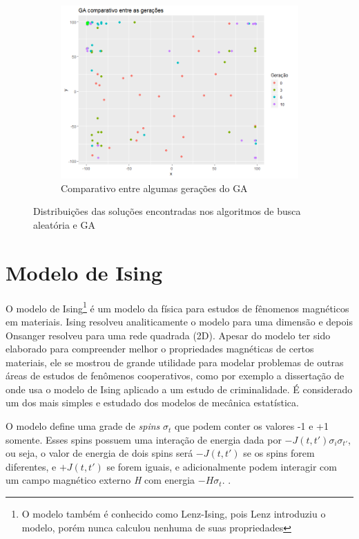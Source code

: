 \begin{figure}[ht]
\begin{subfigure}[b]{0.65\linewidth}
		\includegraphics[width=\linewidth]{imagens/scatter_GA_P30_T10b.png}
		\caption{Comparativo entre algumas gerações do GA}
	\end{subfigure}
	\caption{Distribuições das soluções encontradas nos algoritmos de busca aleatória e GA}
	\label{fig:scatter_RS_GA}
\end{figure}



\section{Modelo de Ising}

O modelo de Ising\footnote{O modelo também é conhecido como Lenz-Ising, pois Lenz introduziu o modelo, porém nunca calculou nenhuma de suas propriedades} é um modelo da física para estudos de fênomenos magnéticos em materiais. Ising resolveu analiticamente o modelo para uma dimensão e depois Onsanger resolveu para uma rede quadrada (2D). Apesar do modelo ter sido elaborado para compreender melhor o propriedades magnéticas de certos materiais, ele se mostrou de grande utilidade para modelar problemas de outras áreas de estudos de fenômenos cooperativos, como por exemplo a dissertação de  onde usa o modelo de Ising aplicado a um estudo de criminalidade. É considerado um dos mais simples e estudado dos modelos de mecânica estatística.

O modelo define uma grade de \textit{spins} \(\sigma_t\) que podem conter os valores -1 e +1 somente. Esses spins possuem uma interação de energia dada por \(-J(t, t')\sigma_i\sigma_{t'}\), ou seja, o valor de energia de dois spins será \(-J(t, t')\) se os spins forem diferentes, e \(+J(t, t')\) se forem iguais, e adicionalmente podem interagir com um campo magnético externo \textit{H} com energia \(-H\sigma_t\). \cite{McCoy1973}.

